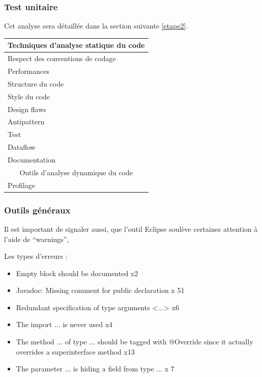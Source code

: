 \documentclass[12pt,a4paper,final]{article}
\begin{document}
\subsubsection{Test unitaire}
Cet analyse sera détaillée dans la section suivante \ref{etape2}.


\begin{tabular}{|l|l|}
\hline
\multicolumn{2}{|c|}{Techniques d'analyse statique du code} \\
\hline
Respect des conventions de codage & \\
\hline
Performances & \\
\hline
Structure du code & \\
\hline
Style du code & \\
\hline
Design flaws  & \\
\hline
Antipattern  & \\
\hline
Test & \\
\hline
Dataflow  & \\
\hline
Documentation & \\
\hline
\multicolumn{2}{|c|}{Outils d'analyse dynamique du code} \\
\hline
Profilage & \\
\hline
\end{tabular}


\subsubsection{Outils généraux}
Il est important de signaler aussi, que l'outil Eclipse soulève certaines attention à l'aide de "`warnings"',  

Les types d'erreurs : 
\begin{itemize}
\item Empty block should be documented x2
\item Javadoc: Missing comment for public declaration x 51
\item Redundant specification of type arguments <...> x6
\item The import ... is never used x4
\item The method ... of type ... should be tagged with @Override since it actually overrides a superinterface method x13
\item The parameter ... is hiding a field from type ... x 7
\end {itemize}
\end{document}

